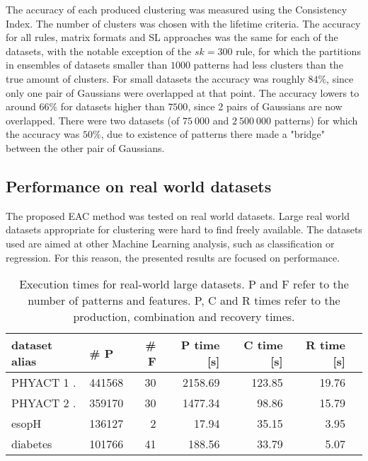 The accuracy of each produced clustering was measured using the Consistency Index.
The number of clusters was chosen with the lifetime criteria.
The accuracy for all rules, matrix formats and SL approaches was the same for each of the datasets, with the notable exception of the $sk=300$ rule, for which the partitions in ensembles of datasets smaller than $1000$ patterns had less clusters than the true amount of clusters.
For small datasets the accuracy was roughly $84\%$, since only one pair of Gaussians were overlapped at that point.
The accuracy lowers to around $66\%$ for datasets higher than $7500$, since 2 pairs of Gaussians are now overlapped.
There were two datasets (of $75 \: 000$ and $2 \: 500 \: 000$ patterns) for which the accuracy was $50\%$, due to existence of patterns there made a "bridge" between the other pair of Gaussians.

\subsection{Performance on real world datasets}

The proposed EAC method was tested on real world datasets.
Large real world datasets appropriate for clustering were hard to find freely available.
The datasets used are aimed at other Machine Learning analysis, such as classification or regression.
For this reason, the presented results are focused on performance.

\begin{table}[h]
\centering
\caption{Execution times for real-world large datasets. P and F refer to the number of patterns and features. P, C and R times refer to the production, combination and recovery times.}

\begin{tabular}{llrrrrr}
\toprule
dataset alias &  \# P &  \# F &  P time [s] &  C time [s] &  R time [s] \\
\midrule
PHYACT 1 \cite{Lichman:2013}.&              441568 &                  30 &      2158.69 &        123.85 &      19.76 \\
PHYACT 2 \cite{Lichman:2013}.&              359170 &                  30 &      1477.34 &         98.86 &      15.79 \\
esopH \cite{yuk13oro}        &                 136127 &                   2 &        17.94 &  35.15 &       3.95 \\
diabetes \cite{strack2014impact,Lichman:2013}&              101766 &                  41 &       188.56 &  33.79 &       5.07 \\
\bottomrule
\end{tabular}


\label{tab:eac rules}
\end{table}